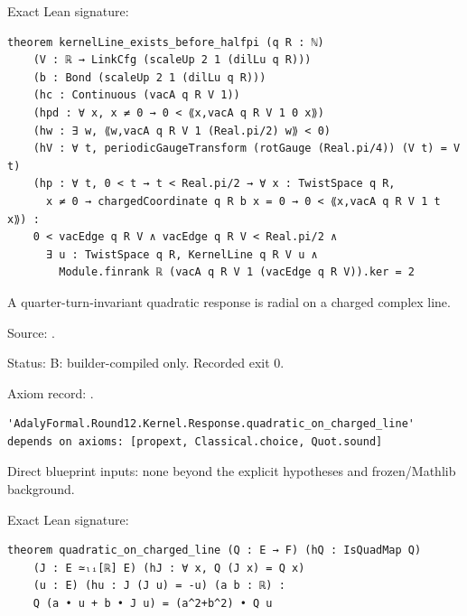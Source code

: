 \begin{theorem}[bp-227]
\begin{itemize}
\end{itemize}
\par Exact Lean signature:
\begin{verbatim}
theorem kernelLine_exists_before_halfpi (q R : ℕ)
    (V : ℝ → LinkCfg (scaleUp 2 1 (dilLu q R)))
    (b : Bond (scaleUp 2 1 (dilLu q R)))
    (hc : Continuous (vacA q R V 1))
    (hpd : ∀ x, x ≠ 0 → 0 < ⟪x,vacA q R V 1 0 x⟫)
    (hw : ∃ w, ⟪w,vacA q R V 1 (Real.pi/2) w⟫ < 0)
    (hV : ∀ t, periodicGaugeTransform (rotGauge (Real.pi/4)) (V t) = V t)
    (hp : ∀ t, 0 < t → t < Real.pi/2 → ∀ x : TwistSpace q R,
      x ≠ 0 → chargedCoordinate q R b x = 0 → 0 < ⟪x,vacA q R V 1 t x⟫) :
    0 < vacEdge q R V ∧ vacEdge q R V < Real.pi/2 ∧
      ∃ u : TwistSpace q R, KernelLine q R V u ∧
        Module.finrank ℝ (vacA q R V 1 (vacEdge q R V)).ker = 2
\end{verbatim}
\end{theorem}

\begin{theorem}[bp-228]
\label{bp-228}
\uses{}
\leanok
A quarter-turn-invariant quadratic response is radial on a charged complex line.

\par Source: \texttt{}.
\par Status: B: builder-compiled only. Recorded exit 0.
\par Axiom record: \texttt{}.
\begin{verbatim}
'AdalyFormal.Round12.Kernel.Response.quadratic_on_charged_line' depends on axioms: [propext, Classical.choice, Quot.sound]
\end{verbatim}
\par Direct blueprint inputs: none beyond the explicit hypotheses and frozen/Mathlib background.
\par Exact Lean signature:
\begin{verbatim}
theorem quadratic_on_charged_line (Q : E → F) (hQ : IsQuadMap Q)
    (J : E ≃ₗᵢ[ℝ] E) (hJ : ∀ x, Q (J x) = Q x)
    (u : E) (hu : J (J u) = -u) (a b : ℝ) :
    Q (a • u + b • J u) = (a^2+b^2) • Q u
\end{verbatim}
\end{theorem}

